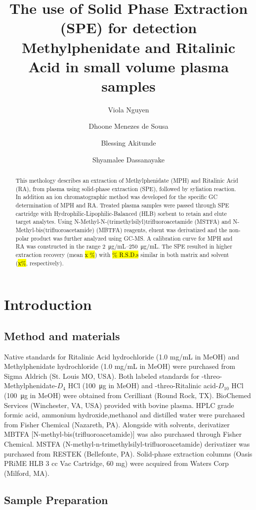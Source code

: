 \documentclass[journal=jacsat,manuscript=article]{achemso}
\author{Viola Nguyen}
\author{Dhoone Menezes de Sousa}
\author{Blessing Akitunde}
\author{Shyamalee Dassanayake}
\affiliation{Icahn School of Medicine}
\title{The use of Solid Phase Extraction (SPE) for detection Methylphenidate and Ritalinic Acid in small volume plasma samples }
\begin{document}
\begin{abstract}
This methology describes an extraction of Methylphenidate (MPH) and Ritalinic Acid (RA), from plasma using solid-phase extraction (SPE), followed by syliation reaction. In addition an ion chromatographic method was developed for the specific GC determination of MPH and RA.  Treated plasma samples were passed through SPE cartridge with Hydrophilic-Lipophilic-Balanced (HLB) sorbent to retain and elute target analytes. Using N-Methyl-N-(trimethylsilyl)trifluoroacetamide (MSTFA) and N-Methyl-bis(trifluoroacetamide) (MBTFA) reagents, eluent was derivatized and the non-polar product was further analyzed using GC-MS. A calibration curve for MPH and RA was constructed in the range  \SIrange[range-units = brackets]{2}{250}{\micro \gram/mL}. The SPE resulted in higher extraction recovery (mean \hl  {x \%}) with \hl {\% R.S.D.s} similar in both matrix and solvent (\hl {x\%}, respectively).

\end{abstract}
\section{Introduction}



\subsection{Method and materials}
Native standards for Ritalinic Acid hydrochloride (1.0 mg/mL in MeOH) and  Methylphenidate hydrochloride (1.0 mg/mL in MeOH) were purchased from Sigma Aldrich (St. Louis MO, USA). Both labeled standards for -threo-Methylphenidate-$D_4$ HCl (\SI{100}{\micro \gram} in MeOH) and -threo-Ritalinic acid-$D_{10}$ HCl (\SI{100}{\micro \gram} in MeOH) were obtained from Cerilliant (Round Rock, TX).
BioChemed Services (Winchester, VA, USA) provided with bovine plasma. HPLC grade formic acid, ammonium hydroxide,methanol and distilled water were purchased from Fisher Chemical (Nazareth, PA). Alongside with solvents, derivatizer MBTFA [N-methyl-bis(trifluoroacetamide)] was also purchased through Fisher Chemical.  MSTFA (N-methyl-n-trimethylsilyl-trifluoroacetamide) derivatizer was purchased from RESTEK (Bellefonte, PA). Solid-phase extraction columns (Oasis PRiME HLB 3 cc Vac Cartridge, 60 mg) were acquired from Waters Corp (Milford, MA).





\subsection{Sample Preparation}
\end{document}

